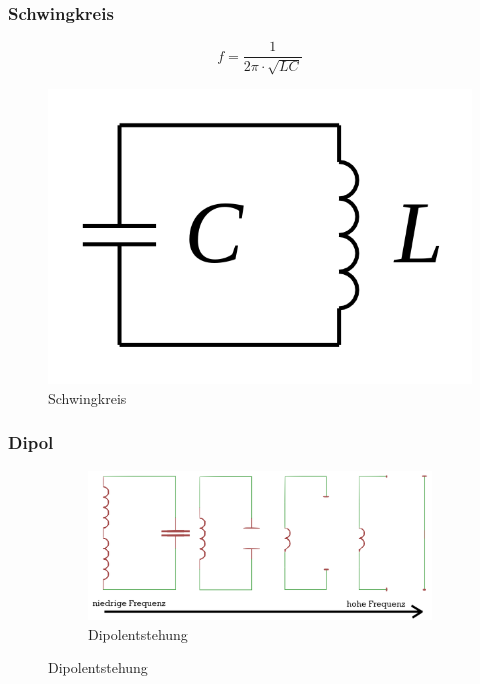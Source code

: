 \begin{frame}
  \frametitle{Schwingkreis}
  \begin{center} \huge
    $$f = \frac{1}{2  \pi \cdot \sqrt{LC}}$$
    \begin{figure}
      \includegraphics[width=.5\textwidth,height=.3\textheight,keepaspectratio]{e11/Schwingkreis.png}
      \caption{Schwingkreis}
    \end{figure}
  \end{center}
\end{frame}

\begin{frame}
  \frametitle{Dipol}
  \begin{center}
    \begin{figure}
      \begin{figure}
        \includegraphics[width=1\textwidth,height=.8\textheight,keepaspectratio]{e11/dipol_entstehung.png}
        \caption{Dipolentstehung}
      \end{figure}
    \end{figure}
  \end{center}
\end{frame}

